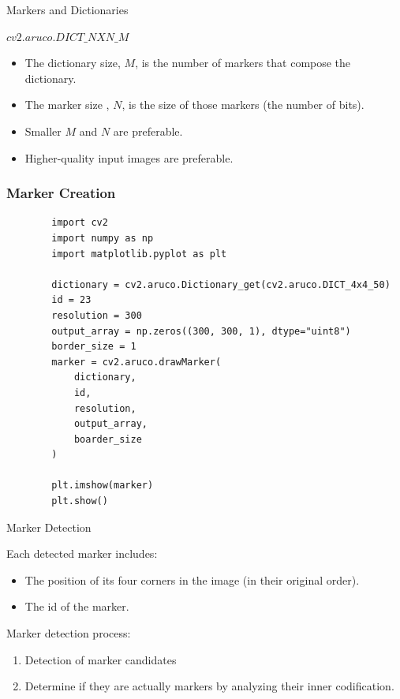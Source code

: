 \documentclass[12pt,letterpaper]{beamer}
\begin{document}
\begin{frame}{Markers and Dictionaries}

    $cv2.aruco.DICT\_NXN\_M$
    {\scriptsize
        \begin{itemize}
            \item The dictionary size, $M$, is the number of markers that compose the dictionary. 
            \item The marker size , $N$, is the size of those markers (the number of bits).
            \item Smaller $M$ and $N$ are preferable.
            \item Higher-quality input images are preferable.
        \end{itemize}
    }

\end{frame}

\begin{frame}[fragile]
    \frametitle{Marker Creation}

    {\scriptsize
    \begin{verbatim}
        import cv2
        import numpy as np
        import matplotlib.pyplot as plt

        dictionary = cv2.aruco.Dictionary_get(cv2.aruco.DICT_4x4_50)
        id = 23
        resolution = 300
        output_array = np.zeros((300, 300, 1), dtype="uint8")
        border_size = 1
        marker = cv2.aruco.drawMarker(
            dictionary, 
            id, 
            resolution, 
            output_array, 
            boarder_size
        )
        
        plt.imshow(marker)
        plt.show()
    \end{verbatim}
}
\end{frame}

\begin{frame}{Marker Detection}

    Each detected marker includes:
    {\scriptsize
        \begin{itemize}
            \item The position of its four corners in the image (in their original order).
            \item The id of the marker.
        \end{itemize}
    }
    Marker detection process:
    {\scriptsize
        \begin{enumerate}
            \item Detection of marker candidates
            \item Determine if they are actually markers by analyzing their inner codification.
        \end{enumerate}
    }
\end{frame}
\end{document}
